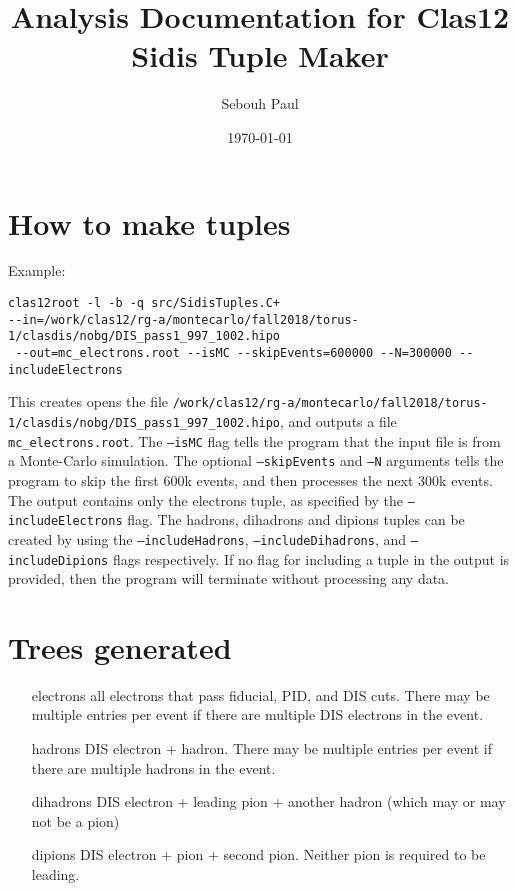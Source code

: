 \documentclass[english]{article}
\newcommand{\code}[1]{\texttt{#1}}
\begin{document}
\title{
Analysis Documentation for Clas12 Sidis Tuple Maker
}

\author{Sebouh Paul}
\date{\today}

\maketitle
\tableofcontents
\newpage

\section{How to make tuples}
Example:


\begin{verbatim}clas12root -l -b -q src/SidisTuples.C+ 
--in=/work/clas12/rg-a/montecarlo/fall2018/torus-1/clasdis/nobg/DIS_pass1_997_1002.hipo 
 --out=mc_electrons.root --isMC --skipEvents=600000 --N=300000 --includeElectrons\end{verbatim}

This creates opens the file \code{/work/clas12/rg-a/montecarlo/fall2018/torus-1/clasdis/nobg/DIS\_pass1\_997\_1002.hipo}, and outputs a file \code{mc\_electrons.root}.  The \code{--isMC} flag tells the program that the input file is from a Monte-Carlo simulation.  The optional \code{--skipEvents} and \code{--N} arguments tells the program to skip the first 600k events, and then processes the next 300k events.  The output contains only the electrons tuple, as specified by the \code{--includeElectrons} flag.  The hadrons, dihadrons and dipions tuples can be created by using the \code{--includeHadrons}, \code{--includeDihadrons}, and \code{--includeDipions} flags respectively.  If no flag for including a tuple in the output is provided, then the program will terminate without processing any data.  
 

\section{Trees generated}
\begin{itemize}
\item[electrons] all electrons that pass fiducial, PID, and DIS cuts.  There may be multiple entries per event if there are multiple DIS electrons in the event.
\item[hadrons] DIS electron + hadron.  There may be multiple entries per event if there are multiple hadrons in the event.  
\item[dihadrons] DIS electron + leading pion + another hadron (which may or may not be a pion)
\item[dipions] DIS electron + pion + second pion.  Neither pion is required to be leading.  
\end{itemize}
\end{document}
